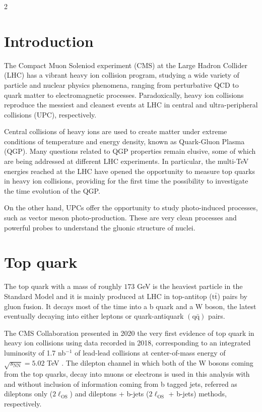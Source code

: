 \documentclass{rmf-d}
\begin{document}
\begin{multicols}{2}


\section{Introduction}

The Compact Muon Soleniod experiment (CMS) at the Large Hadron Collider (LHC) has a vibrant heavy ion collision program, studying a wide variety of particle and nuclear physics phenomena, ranging from perturbative QCD to quark matter to electromagnetic processes. Paradoxically, heavy ion collisions reproduce the messiest and cleanest events at LHC in central and ultra-peripheral collisions (UPC), respectively. 

Central collisions of heavy ions are used to create matter under extreme conditions of temperature and energy density, known as Quark-Gluon Plasma (QGP). Many questions related to QGP properties remain elusive, some of which are being addressed at different LHC experiments. In particular, the multi-TeV energies reached at the LHC have opened the opportunity to measure top quarks in heavy ion collisions, providing \textemdash for the first time \textemdash the possibility to investigate the time evolution of the QGP. 

On the other hand, UPCs offer the opportunity to study photo-induced processes, such as vector meson photo-production. These are very clean processes and powerful probes to understand the gluonic structure of nuclei.  

\section{Top quark}
 The top quark \textemdash with a mass of roughly $173$ GeV \textemdash is the heaviest particle in the Standard Model and it is mainly produced at LHC in top-antitop ($\mathrm{t\bar{t}}$) pairs by gluon fusion. It decays most of the time into a b quark and a W boson, the latest eventually decaying into either leptons or quark-antiquark $(\mathrm{q\bar{q}})$ pairs. 

The CMS Collaboration presented in 2020 the very first evidence of top quark in heavy ion collisions using data recorded in 2018, corresponding to an integrated luminosity of 1.7 nb$^{-1}$ of lead-lead collisions at center-of-mass energy of $\sqrt{s_\mathrm{NN}}=5.02$ TeV \cite{CMS:2020aem}. The dilepton channel \textemdash in which both of the W bosons coming from the top quarks, decay into muons or electrons \textemdash is used in this analysis with and without inclusion of information coming from b tagged jets, referred as dileptons only ($2\ell_{\text{OS}}$) and dileptons + b-jets ($2\ell_{\text{OS}}$ + b-jets) methods, respectively. 


\end{multicols}
\end{document}
